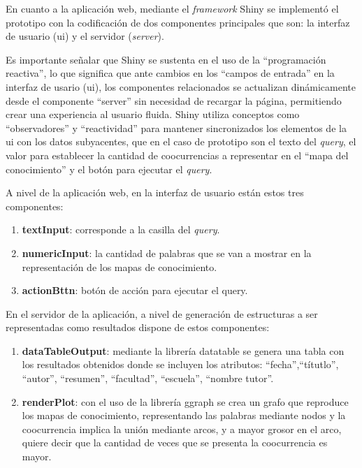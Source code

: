 \documentclass[
  12pt,
  openany]{book}
\begin{document}
En cuanto a la aplicación web, mediante el \emph{framework} Shiny se implementó el prototipo con la codificación de dos componentes principales que son: la interfaz de usuario (ui) y el servidor (\emph{server}).

Es importante señalar que Shiny se sustenta en el uso de la ``programación reactiva'', lo que significa que ante cambios en los ``campos de entrada'' en la interfaz de usario (ui), los componentes relacionados se actualizan dinámicamente desde el componente ``server'' sin necesidad de recargar la página, permitiendo crear una experiencia al usuario fluida. Shiny utiliza conceptos como ``observadores'' y ``reactividad'' para mantener sincronizados los elementos de la ui con los datos subyacentes, que en el caso de prototipo son el texto del \emph{query}, el valor para establecer la cantidad de coocurrencias a representar en el ``mapa del conocimiento'' y el botón para ejecutar el \emph{query}.

\hfill\break
A nivel de la aplicación web, en la interfaz de usuario están estos tres componentes:

\begin{enumerate}
\def\labelenumi{\arabic{enumi}.}
\item
  \textbf{textInput}: corresponde a la casilla del \emph{query}.
\item
  \textbf{numericInput}: la cantidad de palabras que se van a mostrar en la representación de los mapas de conocimiento.
\item
  \textbf{actionBttn}: botón de acción para ejecutar el query.
\end{enumerate}

En el servidor de la aplicación, a nivel de generación de estructuras a ser representadas como resultados dispone de estos componentes:

\begin{enumerate}
\def\labelenumi{\arabic{enumi}.}
\item
  \textbf{dataTableOutput}: mediante la librería datatable \citep{DT} se genera una tabla con los resultados obtenidos donde se incluyen los atributos: ``fecha'',``títutlo'', ``autor'', ``resumen'', ``facultad'', ``escuela'', ``nombre tutor''.
\item
  \textbf{renderPlot}: con el uso de la librería ggraph \citep{ggraph} se crea un grafo que reproduce los mapas de conocimiento, representando las palabras mediante nodos y la coocurrencia implica la unión mediante arcos, y a mayor grosor en el arco, quiere decir que la cantidad de veces que se presenta la coocurrencia es mayor.
\end{enumerate}
\end{document}
